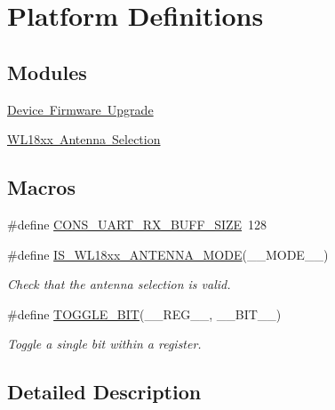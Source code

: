 \hypertarget{group___s_d___platform___defines}{}\section{Platform Definitions}
\label{group___s_d___platform___defines}
\subsection*{Modules}
\begin{DoxyCompactItemize}
\item 
\mbox{\hyperlink{group___s_d___d_f_u___defines}{Device Firmware Upgrade}}
\item 
\mbox{\hyperlink{group___s_d___antenna___select}{W\+L18xx Antenna Selection}}
\end{DoxyCompactItemize}
\subsection*{Macros}
\begin{DoxyCompactItemize}
\item 
\#define \mbox{\hyperlink{group___s_d___platform___defines_gaf42bf8bfc63a6cca851012eeb8e25b52}{C\+O\+N\+S\+\_\+\+U\+A\+R\+T\+\_\+\+R\+X\+\_\+\+B\+U\+F\+F\+\_\+\+S\+I\+ZE}}~128
\item 
\#define \mbox{\hyperlink{group___s_d___platform___defines_ga4140f88e45c8ac3d94ec6ebd12950b27}{I\+S\+\_\+\+W\+L18xx\+\_\+\+A\+N\+T\+E\+N\+N\+A\+\_\+\+M\+O\+DE}}(\+\_\+\+\_\+\+M\+O\+D\+E\+\_\+\+\_\+)
\begin{DoxyCompactList}\small\item\em Check that the antenna selection is valid. \end{DoxyCompactList}\item 
\#define \mbox{\hyperlink{group___s_d___platform___defines_ga7b2c7e2a005cad6b7572974e6a8fd4f8}{T\+O\+G\+G\+L\+E\+\_\+\+B\+IT}}(\+\_\+\+\_\+\+R\+E\+G\+\_\+\+\_\+,  \+\_\+\+\_\+\+B\+I\+T\+\_\+\+\_\+)
\begin{DoxyCompactList}\small\item\em Toggle a single bit within a register. \end{DoxyCompactList}\end{DoxyCompactItemize}


\subsection{Detailed Description}


